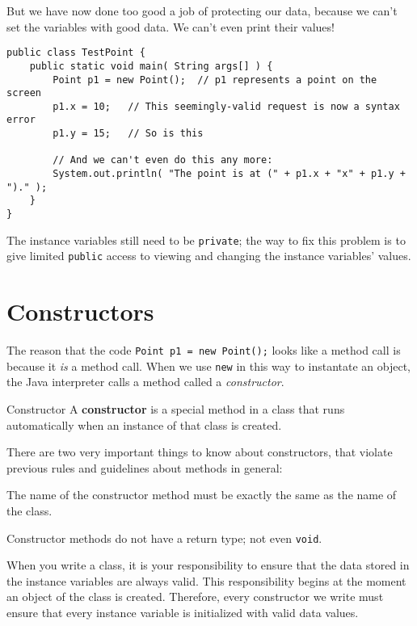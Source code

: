 But we have now done too good a job of protecting our data, because we can't set the variables with good data.  We can't even print their values!

\begin{verbatim}
public class TestPoint {
    public static void main( String args[] ) {
        Point p1 = new Point();  // p1 represents a point on the screen
        p1.x = 10;   // This seemingly-valid request is now a syntax error
        p1.y = 15;   // So is this

        // And we can't even do this any more:
        System.out.println( "The point is at (" + p1.x + "x" + p1.y + ")." );
    }
}
\end{verbatim}

The instance variables still need to be \texttt{private}; the way to fix this problem is to give limited \texttt{public} access to viewing and changing the instance variables' values.

\section{Constructors}

The reason that the code \texttt{Point p1 = new Point();} looks like a method call is because it \textit{is} a method call.  When we use \texttt{new} in this way to instantate an object, the Java interpreter calls a method called a \textit{constructor}.

\begin{defn}{Constructor}
    A \textbf{constructor} is a special method in a class that runs automatically when an instance of that class is created.
\end{defn}

There are two very important things to know about constructors, that violate previous rules and guidelines about methods in general:
\bi
\item The name of the constructor method must be exactly the same as the name of the class.
\item Constructor methods do not have a return type; not even \texttt{void}.
\ei

When you write a class, it is your responsibility to ensure that the data stored in the instance variables are always valid.  This responsibility begins at the moment an object of the class is created.  Therefore, every constructor we write must ensure that every instance variable is initialized with valid data values.

